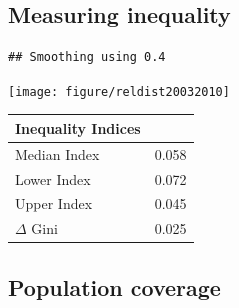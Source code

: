 \documentclass[twoside]{article}\usepackage[]{graphicx}\usepackage[]{color}
\makeatletter
\newenvironment{kframe}{%
 \def\at@end@of@kframe{}%
 \ifinner\ifhmode%
  \def\at@end@of@kframe{\end{minipage}}%
  \begin{minipage}{\columnwidth}%
 \fi\fi%
 \def\FrameCommand##1{\hskip\@totalleftmargin \hskip-\fboxsep
 \colorbox{shadecolor}{##1}\hskip-\fboxsep
     \hskip-\linewidth \hskip-\@totalleftmargin \hskip\columnwidth}%
 \MakeFramed {\advance\hsize-\width
   \@totalleftmargin\z@ \linewidth\hsize
   \@setminipage}}%
 {\par\unskip\endMakeFramed%
 \at@end@of@kframe}
\newenvironment{knitrout}{}{} %
\makeatother
\begin{document}
\begin{multicols}{2}
\subsection{Measuring inequality}






\begin{knitrout}
\color{fgcolor}\begin{kframe}
\begin{verbatim}
## Smoothing using 0.4
\end{verbatim}
\end{kframe}
\texttt{[image: figure/reldist20032010]} 

\end{knitrout}

\begin{kframe}


{\ttfamily\noindent\itshape\color{messagecolor}{\#\# Loading required package: splines}}\end{kframe}%
%
\begin{table}[!tbp]
\begin{center}
\begin{tabular}{ll}
\hline\hline
\multicolumn{1}{l}{Inequality Indices}&\multicolumn{1}{c}{}\tabularnewline
\hline
Median Index&0.058\tabularnewline
Lower Index&0.072\tabularnewline
Upper Index&0.045\tabularnewline
$\Delta$ Gini&0.025\tabularnewline
\hline
\end{tabular}
\end{center}
\end{table}






\subsection{Population coverage}


\end{multicols}
\end{document}
